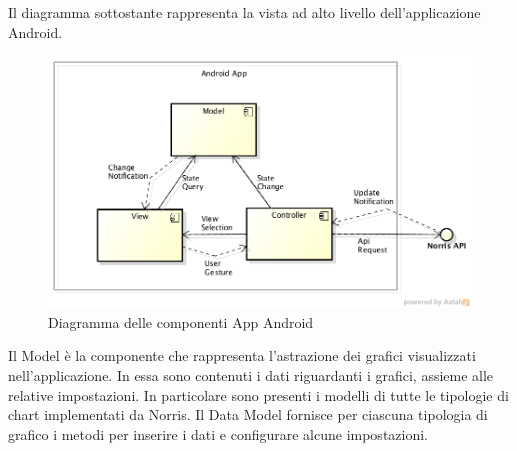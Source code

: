     Il diagramma sottostante rappresenta la vista ad alto livello dell'applicazione Android.
   
    \begin{figure}[H]\centering
        \includegraphics[width=\textwidth]{SpecificaTecnica/Pics/AndroidAppComponentDiagramLevel0.png}
        \caption{Diagramma delle componenti App Android}
    \end{figure}

        Il Model è la componente che rappresenta l'astrazione dei grafici visualizzati nell'applicazione. In essa sono contenuti i dati riguardanti i grafici, assieme alle relative impostazioni. In particolare sono presenti i modelli di tutte le tipologie di chart implementati da Norris. Il Data Model fornisce per ciascuna tipologia di grafico i metodi per inserire i dati e configurare alcune impostazioni. 
    
